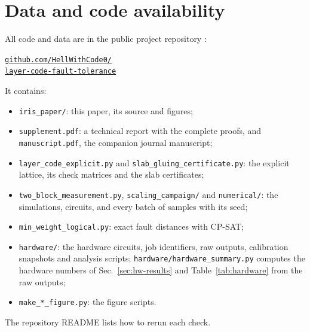 \documentclass[10pt,a4paper,twocolumn]{article}
\newcommand{\repourl}{https://github.com/HellWithCode0/layer-code-fault-tolerance}
\begin{document}
\section*{Data and code availability}
All code and data are in the public project repository \cite{Repo}:
\begin{center}
\href{\repourl}{\texttt{\small github.com/HellWithCode0/}}\\
\href{\repourl}{\texttt{\small layer-code-fault-tolerance}}
\end{center}
It contains:
\begin{itemize}\raggedright
\item \texttt{iris\_paper/}: this paper, its source and figures;
\item \texttt{supplement.pdf}: a technical report with the complete proofs, and
\texttt{manuscript.pdf}, the companion journal manuscript;
\item \texttt{layer\_code\_explicit.py} and \texttt{slab\_gluing\_certificate.py}:
the explicit lattice, its check matrices and the slab certificates;
\item \texttt{two\_block\_measurement.py}, \texttt{scaling\_campaign/} and
\texttt{numerical/}: the simulations, circuits, and every batch of samples with
its seed;
\item \texttt{min\_weight\_logical.py}: exact fault distances with CP-SAT;
\item \texttt{hardware/}: the hardware circuits, job identifiers, raw outputs,
calibration snapshots and analysis scripts;
\texttt{hardware/hardware\_summary.py} computes the hardware numbers of
Sec.~\ref{sec:hw-results} and Table~\ref{tab:hardware} from the raw outputs;
\item \texttt{make\_*\_figure.py}: the figure scripts.
\end{itemize}
The repository README lists how to rerun each check.

\end{document}
